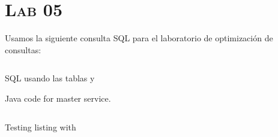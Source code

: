 \section*{\scshape\textbf{Lab 05}}

  Usamos la siguiente consulta SQL para el laboratorio de optimización de consultas:

  \begin{listing}[!ht]
    \inputminted[breaklines, fontfamily=SourceSansPro-TLF]{sql}{../src/query.sql}
    \caption{SQL  usando las tablas  y }
    \label{sql:query}
  \end{listing}

  Java code for master service.

  \begin{listing}[!ht]
    \inputminted[breaklines, fontfamily=SourceSansPro-TLF]{cpp}{../src/competitive_template.cpp}
    \caption{Testing  listing with }
    \label{master_service}
  \end{listing}

